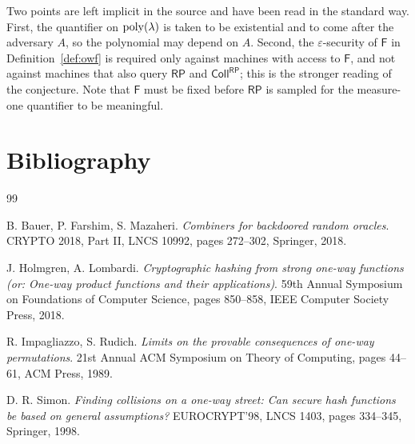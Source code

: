 \documentclass{aicr-conjecture}
\newcommand{\Fo}{\mathsf{F}}          %
\newcommand{\RP}{\mathsf{RP}}
\newcommand{\Coll}{\mathsf{Coll}}
\begin{document}
\begin{remark}\label{rem:readings}
Two points are left implicit in the source and have been read in the
standard way. First, the quantifier on $\mathrm{poly}(\lambda)$ is taken to be
existential and to come after the adversary $A$, so the polynomial may
depend on $A$. Second, the $\varepsilon$-security of $\Fo$ in
Definition~\ref{def:owf} is required only against machines with access to
$\Fo$, and not against machines that also query $\RP$ and $\Coll^{\RP}$;
this is the stronger reading of the conjecture. Note that $\Fo$ must be
fixed before $\RP$ is sampled for the measure-one quantifier to be
meaningful.
\end{remark}

\section{Bibliography}

\begin{aicrbibliography}{99}

B. Bauer, P. Farshim, S. Mazaheri.
\emph{Combiners for backdoored random oracles}.
CRYPTO 2018, Part II, LNCS 10992, pages 272--302, Springer, 2018.

J. Holmgren, A. Lombardi.
\emph{Cryptographic hashing from strong one-way functions (or: One-way
product functions and their applications)}.
59th Annual Symposium on Foundations of Computer Science, pages 850--858,
IEEE Computer Society Press, 2018.

R. Impagliazzo, S. Rudich.
\emph{Limits on the provable consequences of one-way permutations}.
21st Annual ACM Symposium on Theory of Computing, pages 44--61, ACM Press,
1989.

D. R. Simon.
\emph{Finding collisions on a one-way street: Can secure hash functions be
based on general assumptions?}
EUROCRYPT'98, LNCS 1403, pages 334--345, Springer, 1998.

\end{aicrbibliography}
\end{document}
